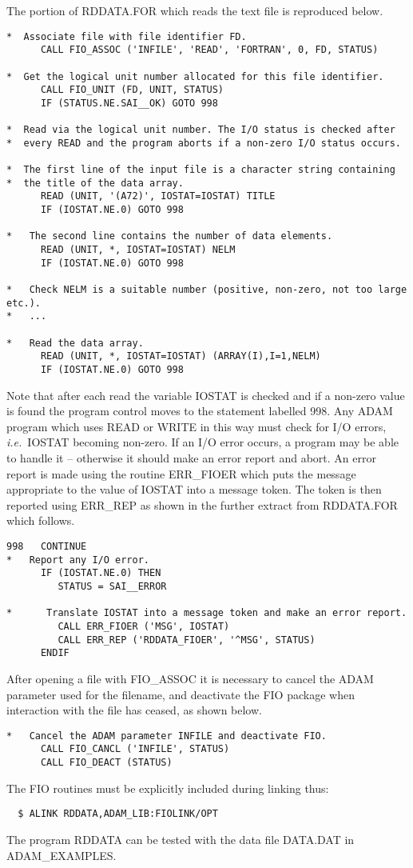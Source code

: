 The portion of RDDATA.FOR which reads the text file is reproduced below.
\begin{verbatim}
*  Associate file with file identifier FD.
      CALL FIO_ASSOC ('INFILE', 'READ', 'FORTRAN', 0, FD, STATUS)

*  Get the logical unit number allocated for this file identifier.
      CALL FIO_UNIT (FD, UNIT, STATUS)      
      IF (STATUS.NE.SAI__OK) GOTO 998

*  Read via the logical unit number. The I/O status is checked after
*  every READ and the program aborts if a non-zero I/O status occurs.

*  The first line of the input file is a character string containing
*  the title of the data array.
      READ (UNIT, '(A72)', IOSTAT=IOSTAT) TITLE
      IF (IOSTAT.NE.0) GOTO 998

*   The second line contains the number of data elements.
      READ (UNIT, *, IOSTAT=IOSTAT) NELM
      IF (IOSTAT.NE.0) GOTO 998

*   Check NELM is a suitable number (positive, non-zero, not too large etc.).
*   ...

*   Read the data array.
      READ (UNIT, *, IOSTAT=IOSTAT) (ARRAY(I),I=1,NELM)
      IF (IOSTAT.NE.0) GOTO 998
\end{verbatim}
Note that after each read the variable IOSTAT is checked and 
if a non-zero value is found the program control moves to the statement
labelled 998.
Any ADAM  program which uses READ or WRITE in this way must check
for I/O errors,  {\it i.e.}\ IOSTAT becoming non-zero.
If an I/O error occurs, a program  may be able to handle it --
otherwise it should make an error report and abort.
An error report is made using the routine ERR\_FIOER which puts 
the message appropriate 
to the value of IOSTAT into a message token. The token is then
reported using ERR\_REP as shown in the  further extract from RDDATA.FOR 
which follows.
\begin{verbatim}
998   CONTINUE
*   Report any I/O error.
      IF (IOSTAT.NE.0) THEN
         STATUS = SAI__ERROR

*      Translate IOSTAT into a message token and make an error report.
         CALL ERR_FIOER ('MSG', IOSTAT)
         CALL ERR_REP ('RDDATA_FIOER', '^MSG', STATUS)
      ENDIF
\end{verbatim}
After opening a file with FIO\_ASSOC it is necessary to cancel the ADAM 
parameter used for the filename, and deactivate the FIO package when 
interaction with the file 
has ceased, as shown below.
\begin{verbatim}
*   Cancel the ADAM parameter INFILE and deactivate FIO.
      CALL FIO_CANCL ('INFILE', STATUS)
      CALL FIO_DEACT (STATUS)
\end{verbatim}
The FIO routines must be explicitly included during linking thus:
\begin{verbatim}
  $ ALINK RDDATA,ADAM_LIB:FIOLINK/OPT
\end{verbatim}
The program RDDATA can be tested with the data file DATA.DAT in 
ADAM\_EXAMPLES.


